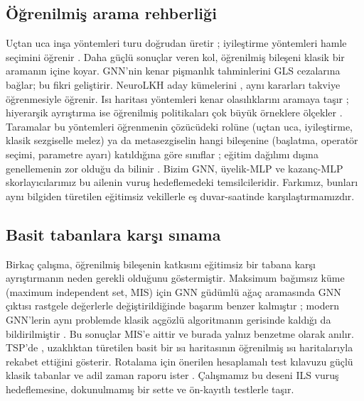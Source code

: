 \documentclass[pdflatex,sn-basic]{sn-jnl}
\begin{document}
\subsection{Öğrenilmiş arama rehberliği}
Uçtan uca inşa yöntemleri turu doğrudan üretir \citep{bello_2017_nco, dai_2017_s2v, kool_2019_attention, kwon_2020_pomo};
iyileştirme yöntemleri hamle seçimini öğrenir \citep{wu_2022_improvement}. Daha güçlü sonuçlar
veren kol, öğrenilmiş bileşeni klasik bir aramanın içine koyar. \citet{hudson_2022_gnngls} GNN'nin
kenar pişmanlık tahminlerini GLS cezalarına bağlar; \citet{sui_2024_neuralgls} bu fikri geliştirir.
NeuroLKH aday kümelerini \citep{xin_2021_neurolkh}, \citet{zheng_2023_rlkh} aynı kararları takviye
öğrenmesiyle öğrenir. Isı haritası yöntemleri kenar olasılıklarını aramaya taşır \citep{fu_2021_generalize, qiu_2022_dimes, sun_2023_difusco}; hiyerarşik ayrıştırma ise öğrenilmiş politikaları çok büyük örneklere ölçekler \citep{pan_2023_htsp}. Taramalar bu yöntemleri öğrenmenin çözücüdeki rolüne (uçtan uca, iyileştirme, klasik sezgiselle melez) ya da metasezgiselin hangi bileşenine (başlatma, operatör seçimi, parametre ayarı) katıldığına göre sınıflar \citep{bengio_2021_mlco, karimimamaghan_2022_mlmeta, sui_2025_survey}; eğitim dağılımı dışına
genellemenin zor olduğu da bilinir \citep{joshi_2020_generalization}. Bizim GNN, üyelik-MLP ve
kazanç-MLP skorlayıcılarımız bu ailenin vuruş hedeflemedeki temsilcileridir. Farkımız, bunları
aynı bilgiden türetilen eğitimsiz vekillerle eş duvar-saatinde karşılaştırmamızdır.

\subsection{Basit tabanlara karşı sınama}
Birkaç çalışma, öğrenilmiş bileşenin katkısını eğitimsiz bir tabana karşı ayrıştırmanın neden
gerekli olduğunu göstermiştir. Maksimum bağımsız küme (maximum independent set, MIS) için GNN güdümlü ağaç aramasında
GNN çıktısı rastgele değerlerle değiştirildiğinde başarım benzer kalmıştır \citep{bother_2022_wrong};
modern GNN'lerin aynı problemde klasik açgözlü algoritmanın gerisinde kaldığı da bildirilmiştir
\citep{angelini_2023_gnngreedy}. Bu sonuçlar MIS'e aittir ve burada yalnız benzetme olarak anılır.
TSP'de \citet{xia_2024_rethinking}, uzaklıktan türetilen basit bir ısı haritasının öğrenilmiş ısı
haritalarıyla rekabet ettiğini gösterir. Rotalama için önerilen hesaplamalı test kılavuzu güçlü
klasik tabanlar ve adil zaman raporu ister \citep{accorsi_2022_guidelines}. Çalışmamız bu deseni
ILS vuruş hedeflemesine, dokunulmamış bir sette ve ön-kayıtlı testlerle taşır.
\end{document}
